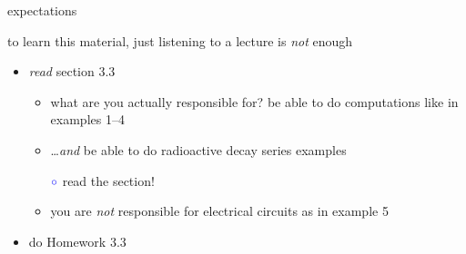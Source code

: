 \documentclass[dvipsnames,colorlinks]{beamer}
\begin{document}
\begin{frame}{expectations}

to learn this material, just listening to a lecture is \emph{not} enough
     \begin{itemize}
     \item \emph{read} section 3.3
         \begin{itemize}
             \item what are you actually responsible for?  \alert{be able to do computations like in examples 1--4}
             \item \dots \emph{and} be able to do radioactive decay series examples

             \hspace{4mm} ${\color{blue} \circ}$ read the section!
         \item you are \emph{not} responsible for electrical circuits as in example 5
         \end{itemize}
     \item do Homework 3.3
     \end{itemize}
\end{frame}
\end{document}
